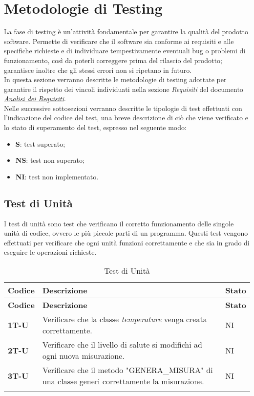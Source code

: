 \section{Metodologie di Testing}
La fase di testing è un'attività fondamentale per garantire la qualità del prodotto software. Permette di verificare che il software sia conforme ai requisiti e alle specifiche richieste e di individuare tempestivamente eventuali bug o problemi di funzionamento, così da poterli correggere prima del rilascio del prodotto; garantisce inoltre che gli stessi errori non si ripetano in futuro. \\
In questa sezione verranno descritte le metodologie di testing adottate per garantire il rispetto dei vincoli individuati nella sezione \textit{Requisiti} del documento \href{https://7last.github.io/docs/rtb/documentazione-esterna/analisi-dei-requisiti}{\textit{Analisi dei Requisiti}}. \\ %
Nelle successive sottosezioni verranno descritte le tipologie di test effettuati con l'indicazione del codice del test, una breve descrizione di ciò che viene verificato e lo stato di superamento del test, espresso nel seguente modo: \\
\begin{itemize}
    \item \textbf{S}: test superato;
    \item \textbf{NS}: test non superato;
    \item \textbf{NI}: test non implementato.
\end{itemize}

\subsection{Test di Unità}
I test di unità sono test che verificano il corretto funzionamento delle singole unità di codice, ovvero le più piccole parti di un programma. Questi test vengono effettuati per verificare che ogni unità funzioni correttamente e che sia in grado di eseguire le operazioni richieste. \\
\begin{longtable}{|>{\raggedright\arraybackslash}m{}|>{\raggedright\arraybackslash}m{}|>{\raggedright\arraybackslash}m{}|}
	\hline
	\textbf{Codice} & \textbf{Descrizione} & \textbf{Stato} \\
	\hline
	\endfirsthead
	\hline
	\textbf{Codice} & \textbf{Descrizione} & \textbf{Stato} \\
	\endhead
	\textbf{1T-U}   & Verificare che la classe \textit{temperature} venga creata correttamente. & NI\\
	\hline
	\textbf{2T-U}   & Verificare che il livello di salute si modifichi ad ogni nuova misurazione.      & NI             \\
	\hline
	\textbf{3T-U}   & Verificare che il metodo "GENERA\_MISURA" di una classe generi correttamente la misurazione.      & NI             \\
	\hline
	\caption{Test di Unità} %
	\label{table:12}
\end{longtable}

